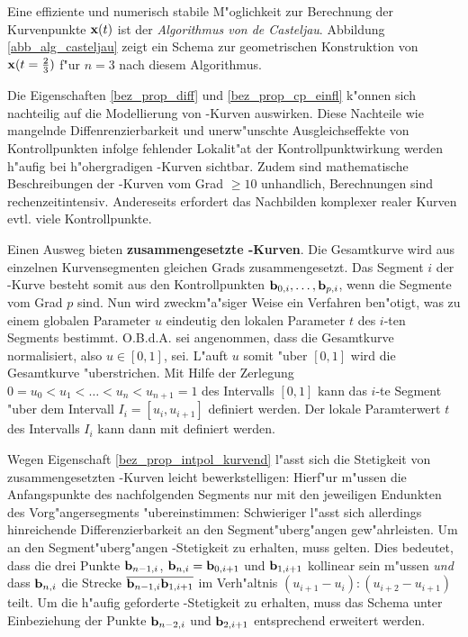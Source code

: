 Eine effiziente und numerisch stabile M"oglichkeit zur Berechnung der 
Kurvenpunkte ${ \bf x}(t)$ ist der \emph{Algorithmus von de Casteljau}. 
Abbildung \ref{abb_alg_casteljau} zeigt ein Schema zur geometrischen 
Konstruktion von ${\bf x}(t=\frac{2}{3})$ f"ur $n=3$ nach diesem Algorithmus. 


Die Eigenschaften \ref{bez_prop_diff} und \ref{bez_prop_cp_einfl} k"onnen sich 
nachteilig auf die Modellierung von \bez-Kurven auswirken. Diese Nachteile 
wie mangelnde Diffenrenzierbarkeit und unerw"unschte Ausgleichseffekte von 
Kontrollpunkten infolge fehlender Lokalit"at der Kontrollpunktwirkung werden 
h"aufig bei h"ohergradigen \bez-Kurven sichtbar. Zudem sind mathematische 
Beschreibungen der \bez-Kurven vom Grad $\ge 10$ unhandlich, Berechnungen sind 
rechenzeitintensiv. Andereseits erfordert das Nachbilden komplexer realer 
Kurven evtl. viele Kontrollpunkte. 

Einen Ausweg bieten \textbf{zusammengesetzte \bez-Kurven}. Die Gesamtkurve 
wird aus einzelnen Kurvensegmenten gleichen Grads zusammengesetzt. 
Das Segment $i$ der \bez-Kurve besteht somit aus den Kontrollpunkten 
${\bf b}_{0,i}, \dots, {\bf b}_{p, i}$, wenn die Segmente vom Grad $p$ sind. 
Nun wird zweckm"a"siger Weise ein Verfahren ben"otigt, was zu einem globalen 
Parameter $u$ eindeutig den lokalen Parameter $t$ des $i$-ten Segments 
bestimmt. O.B.d.A. sei angenommen, dass die Gesamtkurve normalisiert, also 
$u \in [0, 1]$, sei. L"auft $u$ somit "uber $[0, 1]$ wird die Gesamtkurve 
"uberstrichen. Mit Hilfe der Zerlegung $0=u_0<u_1<\dots<u_n<u_{n+1}=1$ des 
Intervalls $[0, 1]$ kann das $i$-te Segment "uber dem Intervall 
$I_i = [u_i, u_{i+1}]$ definiert werden. Der lokale Paramterwert $t$ des 
Intervalls $I_i$ kann dann mit
definiert werden. 

Wegen Eigenschaft \ref{bez_prop_intpol_kurvend} l"asst 
sich die Stetigkeit von zusammengesetzten \bez-Kurven leicht bewerkstelligen: 
Hierf"ur m"ussen die Anfangspunkte des nachfolgenden Segments nur mit den 
jeweiligen Endunkten des Vorg"angersegments "ubereinstimmen:
Schwieriger l"asst sich allerdings hinreichende Differenzierbarkeit an den 
Segment"uberg"angen gew"ahrleisten. Um an den Segment"uberg"angen 
\conti-Stetigkeit zu erhalten, muss
gelten. Dies bedeutet, dass die drei Punkte ${\bf b}_{n-1, i}$, 
${\bf b}_{n, i}={\bf b}_{0, i+1}$ und ${\bf b}_{1, i+1}$ kollinear sein 
m"ussen \emph{und} dass ${\bf b}_{n, i}$ die Strecke 
$\overline{{\bf b}_{n-1, i}{\bf b}_{1, i+1}}$ im Verh"altnis 
\hbox{\((u_{i+1} - u_i) : (u_{i+2} - u_{i+1})\)} teilt. 
Um die h"aufig geforderte \contii-Stetigkeit zu erhalten, muss das Schema 
unter Einbeziehung der Punkte ${\bf b}_{n-2, i}$ und ${\bf b}_{2, i+1}$ 
entsprechend erweitert werden. 

